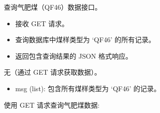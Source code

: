 \documentclass[a4paper,12pt,english]{sphinxmanual}
\begin{document}
\begin{fulllineitems}
\label{\detokenize{api/login:login.getQiFeiCoalData}}
\pysigstartsignatures
{}
\pysigstopsignatures
\sphinxAtStartPar
查询气肥煤（QF46）数据接口。
\begin{description}
\begin{itemize}
\item {} 
\sphinxAtStartPar
接收 GET 请求。

\item {} 
\sphinxAtStartPar
查询数据库中煤样类型为 ‘QF46’ 的所有记录。

\item {} 
\sphinxAtStartPar
返回包含查询结果的 JSON 格式响应。

\end{itemize}

\sphinxAtStartPar
无（通过 GET 请求获取数据）。

\begin{description}
\begin{itemize}
\item {} 
\sphinxAtStartPar
msg (list): 包含所有煤样类型为 ‘QF46’ 的记录。

\end{itemize}

\end{description}

\sphinxAtStartPar
使用 GET 请求查询气肥煤数据:

\begin{sphinxVerbatim}[commandchars=\\\{\}]
 


\end{sphinxVerbatim}
\end{description}
\end{fulllineitems}
\end{document}
